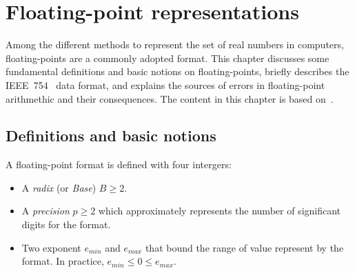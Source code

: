 \chapter{Floating-point representations}
\label{ch:background}
Among the different methods to represent the set of real numbers in computers,
floating-points are a commonly adopted format.
This chapter discusses some fundamental definitions and basic notions on
floating-points, briefly describes the IEEE~754~\cite{ieee754_2008-ev} data format, and 
explains the sources of errors in floating-point arithmethic and their consequences.
The content in this chapter is based on~\cite{Muller2018-zm}.

\section{Definitions and basic notions}
A floating-point format is defined with four intergers:
\begin{itemize}
	\item A \textit{radix} (or \textit{Base}) $B \ge 2$.
	\item A \textit{precision} $p \ge 2$ which approximately represents the number of significant digits for the format.
	\item Two exponent $e_{min}$ and $e_{max}$ that bound the range of value represent by the format. In practice, $e_{min} \le 0 \le e_{max}$.
\end{itemize}

